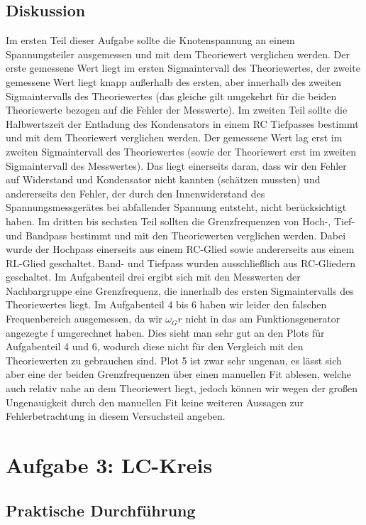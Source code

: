 \documentclass[12pt]{scrartcl}
\begin{document}
\subsection{Diskussion}
Im ersten Teil dieser Aufgabe sollte die Knotenspannung an einem Spannungsteiler ausgemessen und mit dem Theoriewert verglichen werden. Der erste gemessene Wert liegt im ersten Sigmaintervall des Theoriewertes, der zweite gemessene Wert liegt knapp außerhalb des ersten, aber innerhalb des zweiten Sigmaintervalls des Theoriewertes (das gleiche gilt umgekehrt für die beiden Theoriewerte bezogen auf die Fehler der Messwerte). 
Im zweiten Teil sollte die Halbwertszeit der Entladung des Kondensators in einem RC Tiefpasses bestimmt und mit dem Theoriewert verglichen werden. Der gemessene Wert lag erst im zweiten Sigmaintervall des Theoriewertes (sowie der Theoriewert erst im zweiten Sigmaintervall des Messwertes). Das liegt einerseits daran, dass wir den Fehler auf Widerstand und Kondensator nicht kannten (schätzen mussten) und andererseits den Fehler, der durch den Innenwiderstand des Spannungsmessgerätes bei abfallender Spannung entsteht, nicht berücksichtigt haben.
Im dritten bis sechsten Teil sollten die Grenzfrequenzen von Hoch-, Tief- und Bandpass bestimmt und mit den Theoriewerten verglichen werden. Dabei wurde der Hochpass einerseits aus einem RC-Glied sowie andererseits aus einem RL-Glied geschaltet. Band- und Tiefpass wurden ausschließlich aus RC-Gliedern geschaltet. Im Aufgabenteil drei ergibt sich mit den Messwerten der Nachbargruppe eine Grenzfrequenz, die innerhalb des ersten Sigmaintervalls des Theoriewertes liegt.
Im Aufgabenteil 4 bis 6 haben wir leider den falschen Frequenbereich ausgemessen, da wir $\omega_Gr$ nicht in das am Funktionsgenerator angezegte f umgerechnet haben.
Dies sieht man sehr gut an den Plots
für Aufgabenteil 4 und 6, wodurch diese nicht für den Vergleich mit den Theoriewerten zu gebrauchen sind.
Plot 5 ist zwar sehr ungenau, es lässt sich aber eine der beiden Grenzfrequenzen über einen manuellen Fit ablesen, welche auch relativ nahe an dem Theoriewert liegt, jedoch können wir wegen der großen Ungenauigkeit durch den manuellen Fit keine weiteren Aussagen zur Fehlerbetrachtung in diesem Versuchsteil angeben.
\section{Aufgabe 3: LC-Kreis}
\subsection{Praktische Durchführung}
\end{document}
